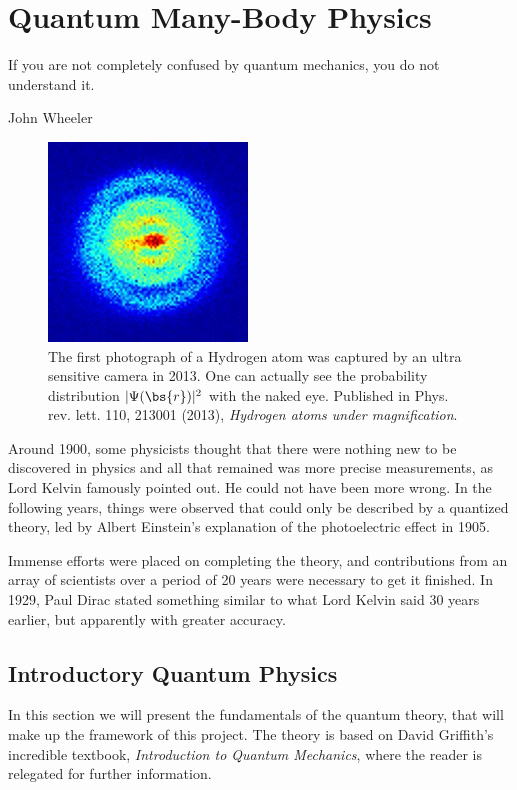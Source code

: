 \chapter{Quantum Many-Body Physics} \label{chp:quantum}
\epigraph{If you are not completely confused by quantum mechanics, you do not understand it.}{John Wheeler}
\begin{figure}[H]
	\centering
	\captionsetup[subfigure]{labelformat=empty}
	\includegraphics[scale=3.0]{Images/art_quantum.jpg}
	\caption{The first photograph of a Hydrogen atom was captured by an ultra sensitive camera in 2013. One can actually see the probability distribution $|\Psi(\bs{r})|^2$ with the naked eye. Published in Phys. rev. lett. 110, 213001 (2013), \textit{Hydrogen atoms under magnification}. \cite{stodolna_hydrogen_2013}}
\end{figure}
Around 1900, some physicists thought that there were nothing new to be discovered in physics and all that remained was more precise measurements, as Lord Kelvin famously pointed out. \cite{weisstein_kelvin_2007} He could not have been more wrong. In the following years, things were observed that could only be described by a quantized theory, led by Albert Einstein's explanation of the photoelectric effect in 1905. 

Immense efforts were placed on completing the theory, and contributions from an array of scientists over a period of 20 years were necessary to get it finished. In 1929, Paul Dirac stated something similar to what Lord Kelvin said 30 years earlier, but apparently with greater accuracy. 

\newpage
\section{Introductory Quantum Physics} \label{subsec:elementary}
In this section we will present the fundamentals of the quantum theory, that will make up the framework of this project. The theory is based on David Griffith's incredible textbook, \textit{Introduction to Quantum Mechanics}, where the reader is relegated for further information.

